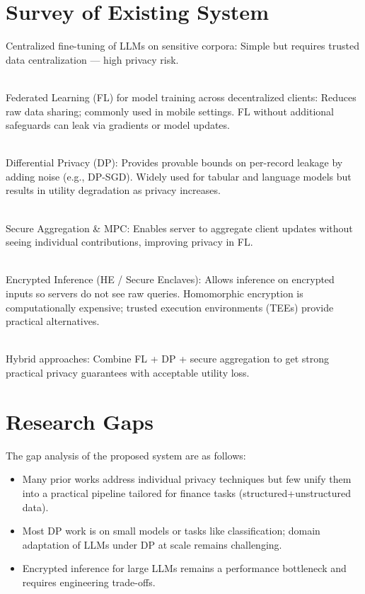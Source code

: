 \documentclass[12pt,a4paper]{report}
\begin{document}
   



\section{Survey of Existing System}
Centralized fine-tuning of LLMs on sensitive corpora: Simple but requires trusted data centralization — high privacy risk. 

\textbf{} \\Federated Learning (FL) for model training across decentralized clients: Reduces raw data sharing; commonly used in mobile settings. FL without additional safeguards can leak via gradients or model updates.

\textbf{} \\Differential Privacy (DP): Provides provable bounds on per-record leakage by adding noise (e.g., DP-SGD). Widely used for tabular and language models but results in utility degradation as privacy increases.
\thispagestyle{plain}

\vspace{1cm}


\textbf{} \\Secure Aggregation \& MPC: Enables server to aggregate client updates without seeing individual contributions, improving privacy in FL.

\textbf{} \\Encrypted Inference (HE / Secure Enclaves): Allows inference on encrypted inputs so servers do not see raw queries. Homomorphic encryption is computationally expensive; trusted execution environments (TEEs) provide practical alternatives.

\textbf{} \\Hybrid approaches: Combine FL + DP + secure aggregation to get strong practical privacy guarantees with acceptable utility loss. \\

\section{Research Gaps}
The gap analysis of the proposed system are as follows:
\begin{itemize}
\item Many prior works address individual privacy techniques but few unify them into a practical pipeline tailored for finance tasks (structured+unstructured data).

\item Most DP work is on small models or tasks like classification; domain adaptation of LLMs under DP at scale remains challenging.

\item Encrypted inference for large LLMs remains a performance bottleneck and requires engineering trade-offs.
 
\end{itemize}
\end{document}
